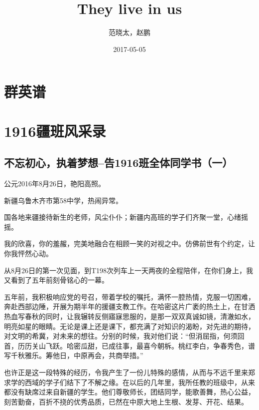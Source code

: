 \documentclass[openany]{ctexbook}
\title{They live in us}
\author{范晓太，赵鹏}
\date{2017-05-05}
\begin{document}
\maketitle


\thispagestyle{empty}

\setlength{\abovedisplayskip}{-5pt}
\setlength{\abovedisplayshortskip}{-5pt}

{
\setcounter{tocdepth}{2}
\tableofcontents
}
\mainmatter

\part{群英谱}\label{qyp}

\part{1916疆班风采录}\label{part-1916}

\chapter*{不忘初心，执着梦想--告1916班全体同学书（一）}\label{letter1}

公元2016年8月26日，艳阳高照。

新疆乌鲁木齐市第58中学，热闹异常。

国各地来疆接待新生的老师，风尘仆仆；新疆内高班的学子们齐聚一堂，心绪摇摇。

我的欣喜，你的羞赧，完美地融合在相顾一笑的对视之中。仿佛前世有个约定，让你我怦然心动。

从8月26日的第一次见面，到T198次列车上一天两夜的全程陪伴，在你们身上，我又看到了五年前刻骨铭心的一幕。

五年前，我积极响应党的号召，带着学校的嘱托，满怀一腔热情，克服一切困难，奔赴西部边陲，开展为期半年的援疆支教工作。在哈密这片广袤的热土上，在甘洒热血写春秋的同时，让我辗转反侧寤寐思服的，是那一双双真诚如镜，清澈如水，明亮如星的眼睛。无论是课上还是课下，都充满了对知识的渴盼，对先进的期待，对文明的希冀，对未来的想往。分别的时候，我对他们说：``但消屈指，何须回首，历历关山飞跃。哈密瓜甜，已成往事，最喜今朝柝。桃红李白，争春秀色，谱写千秋雅乐。筹他日，中原再会，共商举措。''

也许正是这一段特殊的经历，令我产生了一份儿特殊的感情，从而与不远千里来郑求学的西域的学子们结下了不解之缘。在以后的几年里，我所任教的班级中，从来都没有缺席过来自新疆的学生。他们尊敬师长，团结同学，能歌善舞，热心公益，刻苦勤奋，百折不挠的优秀品质，已然在中原大地上生根、发芽、开花、结果。
\end{document}
